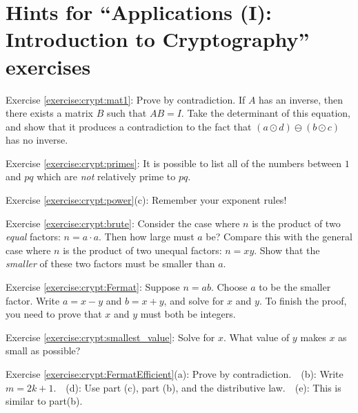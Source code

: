 \section{Hints for ``Applications (I): Introduction to Cryptography'' exercises}\label{sec:crypt:hints}

\noindent Exercise \ref{exercise:crypt:mat1}: Prove by contradiction.  If $A$ has an inverse, then there exists a matrix $B$ such that $AB = I$.  Take the determinant of this equation, and show that it produces a contradiction to the fact that $(a \odot d)  \ominus (b \odot c)$ has no inverse.

\noindent Exercise \ref{exercise:crypt:primes}: It is possible to list all of the numbers between $1$ and $pq$ which are \emph{not} relatively prime to $pq$.

\noindent Exercise \ref{exercise:crypt:power}(c): Remember your exponent rules!

\noindent Exercise \ref{exercise:crypt:brute}: Consider the case where $n$ is the product of two \emph{equal} factors:  $n=a \cdot a$. Then how large must $a$ be?  Compare this with the general case where $n$ is the product of two unequal factors:  $n = xy$. Show that the \emph{smaller} of these two factors must be smaller than $a$.

\noindent Exercise \ref{exercise:crypt:Fermat}: Suppose $n=ab$. Choose $a$ to be the smaller factor.  Write $a = x-y$ and $b = x+y$, and solve for $x$ and $y$. To finish the proof, you need to prove that $x$ and $y$ must both be integers.

\noindent Exercise \ref{exercise:crypt:smallest_value}: Solve for $x$. What value of $y$ makes $x$ as small as possible?

\noindent Exercise \ref{exercise:crypt:FermatEfficient}(a): Prove by contradiction.~~(b): Write $m = 2k+1$.~~(d): Use part (c), part (b), and the distributive law.~~(e): This is similar to part(b).